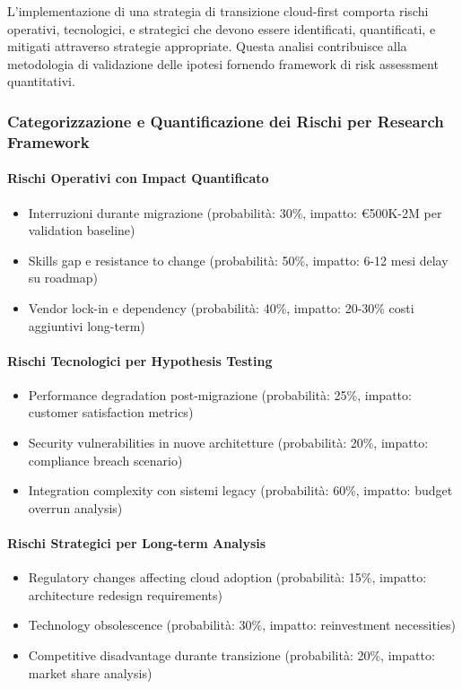 L'implementazione di una strategia di transizione cloud-first comporta rischi operativi, tecnologici, e strategici che devono essere identificati, quantificati, e mitigati attraverso strategie appropriate. Questa analisi contribuisce alla metodologia di validazione delle ipotesi fornendo framework di risk assessment quantitativi.

\subsubsection{Categorizzazione e Quantificazione dei Rischi per Research Framework}

\paragraph{Rischi Operativi con Impact Quantificato}
\begin{itemize}
    \item Interruzioni durante migrazione (probabilità: 30\%, impatto: €500K-2M per validation baseline)
    \item Skills gap e resistance to change (probabilità: 50\%, impatto: 6-12 mesi delay su roadmap)
    \item Vendor lock-in e dependency (probabilità: 40\%, impatto: 20-30\% costi aggiuntivi long-term)
\end{itemize}

\paragraph{Rischi Tecnologici per Hypothesis Testing}
\begin{itemize}
    \item Performance degradation post-migrazione (probabilità: 25\%, impatto: customer satisfaction metrics)
    \item Security vulnerabilities in nuove architetture (probabilità: 20\%, impatto: compliance breach scenario)
    \item Integration complexity con sistemi legacy (probabilità: 60\%, impatto: budget overrun analysis)
\end{itemize}

\paragraph{Rischi Strategici per Long-term Analysis}
\begin{itemize}
    \item Regulatory changes affecting cloud adoption (probabilità: 15\%, impatto: architecture redesign requirements)
    \item Technology obsolescence (probabilità: 30\%, impatto: reinvestment necessities)
    \item Competitive disadvantage durante transizione (probabilità: 20\%, impatto: market share analysis)
\end{itemize}

